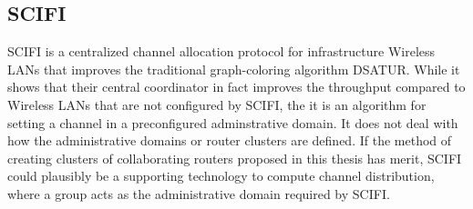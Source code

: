 \subsection{SCIFI}
SCIFI \cite{SCIFI} is a centralized channel allocation protocol for infrastructure Wireless LANs that improves the traditional graph-coloring algorithm DSATUR. While it shows that their central coordinator
in fact improves the throughput compared to Wireless LANs that are not configured by SCIFI, the it is an algorithm for setting a channel in a preconfigured adminstrative domain. It does not deal with how the administrative domains
or router clusters are defined. If the method of creating clusters of collaborating routers proposed in this thesis has merit, SCIFI could plausibly be a supporting technology to compute channel distribution,
where a group acts as the administrative domain required by SCIFI. 


